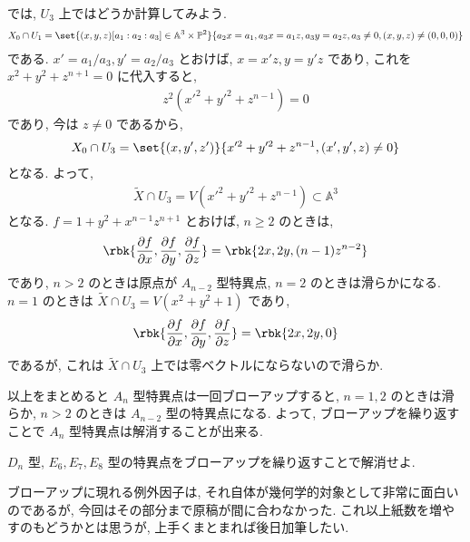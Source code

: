 \documentclass[openany, a4paper, oneside]{jsbook}
\begin{document}
\begin{ex}
では,  $U_3$ 上ではどうか計算してみよう.
\begin{align}
 X_0 \cap U_1
 =
 \set{(x,y,z) [a_1:a_2:a_3] \in \mathbb{A}^3 \times \mathbb{P}^2}{a_2x=a_1, a_3x=a_1z, a_3y=a_2z, a_3 \neq 0, (x,y,z) \neq (0,0,0)}
\end{align}
である.
$x'=a_1/a_3, y'=a_2/a_3$ とおけば, $x=x'z, y=y'z$ であり, これを $x^2+y^2+z^{n+1}=0$ に代入すると,
\begin{align}
 z^2 (x'^2+ y'^2+z^{n-1})
 =
 0
\end{align}
であり, 今は $z \neq 0$ であるから,
\begin{align}
 X_0 \cap U_3
 =
 \set{(x,y',z')}{x'^2+y'^2+z^{n-1}, (x',y',z) \neq 0}
\end{align}
となる.
よって,
\begin{align}
 \widetilde{X} \cap U_3
 =
 V (x'^2+y'^2+z^{n-1}) \subset \mathbb{A}^3
\end{align}
となる.
$f=1+y^2+x^{n-1}z^{n+1}$ とおけば, $n \geq 2$ のときは,
\begin{align}
 \rbk{\frac{\partial f}{\partial x}, \frac{\partial f}{\partial y}, \frac{\partial f}{\partial z}}
 =
 \rbk{2x, 2y, (n-1) z^{n-2}}
\end{align}
であり, $n>2$ のときは原点が $A_{n-2}$ 型特異点, $n=2$ のときは滑らかになる.
$n=1$ のときは $\widetilde{X} \cap U_3 = V (x^2+y^2+1)$ であり,
\begin{align}
 \rbk{\frac{\partial f}{\partial x}, \frac{\partial f}{\partial y}, \frac{\partial f}{\partial z}}
 =
 \rbk{2x, 2y, 0}
\end{align}
であるが, これは $\widetilde{X} \cap U_3$ 上では零ベクトルにならないので滑らか.

以上をまとめると $A_n$ 型特異点は一回ブローアップすると,
$n=1,2$ のときは滑らか, $n>2$ のときは $A_{n-2}$ 型の特異点になる.
よって, ブローアップを繰り返すことで $A_n$ 型特異点は解消することが出来る. \fin
\end{ex}
\begin{exercise}
$D_n$ 型, $E_6, E_7, E_8$ 型の特異点をブローアップを繰り返すことで解消せよ. \fin
\end{exercise}
\begin{rem}
ブローアップに現れる例外因子は, それ自体が幾何学的対象として非常に面白いのであるが,
今回はその部分まで原稿が間に合わなかった.
これ以上紙数を増やすのもどうかとは思うが, 上手くまとまれば後日加筆したい. \fin
\end{rem}
\end{document}
